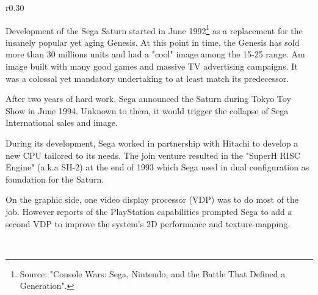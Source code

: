 \begin{wrapfigure}[10]{r}{0.30\textwidth}{
\centering {}}
\end{wrapfigure}
Development of the Sega Saturn started in June 1992\footnote{Source: "Console Wars: Sega, Nintendo, and the Battle That Defined a Generation".} as a replacement for the insanely popular yet aging Genesis. At this point in time, the Genesis has sold more than 30 millions units and had a "cool" image among the 15-25 range. Am image built with many good games and massive TV advertising campaigns. It was a colossal yet mandatory undertaking to at least match its predecessor.\\
\par
After two years of hard work, Sega announced the Saturn during Tokyo Toy Show in June 1994. Unknown to them, it would trigger the collapse of Sega International sales and image.\\
\par
During its development, Sega worked in partnership with Hitachi to develop a new CPU tailored to its needs. The join venture resulted in the "SuperH RISC Engine" (a.k.a SH-2) at the end of 1993 which Sega used in dual configuration as foundation for the Saturn.\\
\par
 On the graphic side, one video display processor (VDP) was to do most of the job. However reports of the PlayStation capabilities prompted Sega to add a second VDP to improve the system's 2D performance and texture-mapping.\\
\par
{}\\

